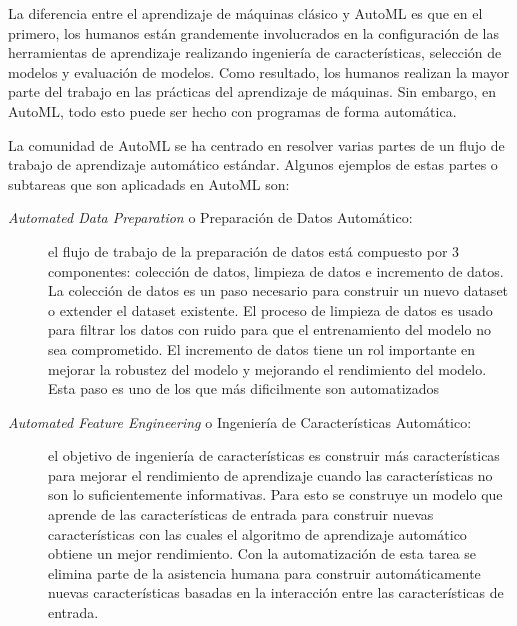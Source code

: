 La diferencia entre el aprendizaje de máquinas clásico y AutoML es que en el primero, los humanos están grandemente involucrados en la configuración de las herramientas de aprendizaje realizando ingeniería de características, selección de modelos y evaluación de modelos. Como resultado, los humanos realizan la mayor parte del trabajo en las prácticas del aprendizaje de máquinas. Sin embargo, en AutoML, todo esto puede ser hecho con programas de forma automática.

La comunidad de AutoML se ha centrado en resolver varias partes de un flujo de trabajo de aprendizaje automático estándar. Algunos ejemplos de estas partes o subtareas que son aplicadads en AutoML son:

\begin{description}
	\item[\textit{Automated Data Preparation} o Preparación de Datos Automático:] el flujo de trabajo de la preparación de datos está compuesto por 3 componentes: colección de datos, limpieza de datos e incremento de datos. La colección de datos es un paso necesario para construir un nuevo dataset o extender el dataset existente. El proceso de limpieza de datos es usado para filtrar los datos con ruido para que el entrenamiento del modelo no sea comprometido. El incremento de datos tiene un rol importante en mejorar la robustez del modelo y mejorando el rendimiento del modelo. Esta paso es uno de los que más dificilmente son automatizados
	
	\item[\textit{Automated Feature Engineering} o Ingeniería de Características Automático:] el objetivo de ingeniería de características es construir más características para mejorar el rendimiento de aprendizaje cuando las características no son lo suficientemente informativas. Para esto se construye un modelo que aprende de las características de entrada para construir nuevas características con las cuales el algoritmo de aprendizaje automático obtiene un mejor rendimiento. Con la automatización de esta tarea se elimina parte de la asistencia humana para construir automáticamente nuevas características basadas en la interacción entre las características de entrada.
	


\end{description}
